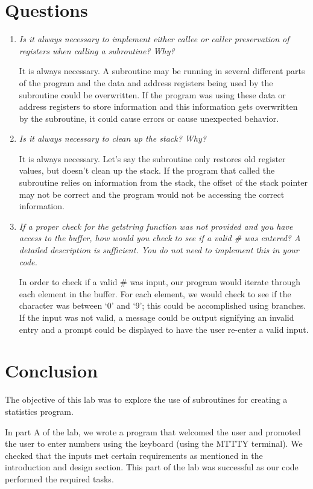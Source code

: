 \documentclass[10pt, letterpaper, titlepage]{article} %
\begin{document}
\begin{multicols*}{2}
\section{Questions}
\begin{enumerate}
\item \textit{Is it always necessary to implement either callee or caller preservation of registers when calling a subroutine? Why?}

It is always necessary. 
A subroutine may be running in several different parts of the program and the data and address registers being used by the subroutine could be overwritten. 
If the program was using these data or address registers to store information and this information gets overwritten by the subroutine, it could cause errors or cause unexpected behavior.

\item \textit{Is it always necessary to clean up the stack? Why?}

It is always necessary. 
Let's say the subroutine only restores old register values, but doesn't clean up the stack. 
If the program that called the subroutine relies on information from the stack, the offset of the stack pointer may not be correct and the program would not be accessing the correct information. 

\item \textit{If a proper check for the getstring function was not provided and you have access to the buffer, how would you check to see if a valid \# was entered? A detailed description is sufficient. You do not need to implement this in your code.}

In order to check if a valid \# was input, our program would iterate through each element in the buffer. 
For each element, we would check to see if the character was between `0' and `9'; this could be accomplished using branches. 
If the input was not valid, a message could be output signifying an invalid entry and a prompt could be displayed to have the user re-enter a valid input. 
\end{enumerate}

\section{Conclusion}
The objective of this lab was to explore the use of subroutines for creating a statistics program. 

In part A of the lab, we wrote a program that welcomed the user and promoted the user to enter numbers using the keyboard (using the MTTTY terminal). 
We checked that the inputs met certain requirements as mentioned in the introduction and design section. 
This part of the lab was successful as our code performed the required tasks.


\end{multicols*}
\end{document}
